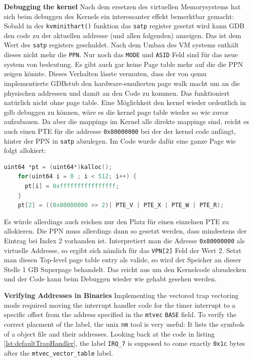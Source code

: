 \textbf{Debugging the kernel} Nach dem ersetzen des virtuellen Memorysystems hat sich beim
debuggen des Kernels ein interessanter effekt bemerktbar gemacht: Sobald in der
\texttt{kvminithart()} funktion das \texttt{satp} register gesetzt wird kann GDB den code zu der
aktuellen addresse (und allen folgenden) anzeigen.
Das ist dem Wert des \texttt{satp} registers geschuldet. Nach dem Umbau des VM systems enthält
dieses nicht mehr die \texttt{PPN}. Nur noch das \texttt{MODE} und \texttt{ASID} Feld sind
für das neue system von bedeutung. Es gibt auch gar keine Page table mehr auf die die PPN zeigen
könnte.
Dieses Verhalten lässte vermuten, dass der von qemu implementierte GDBstub den hardware-emulierten
page walk macht um an die physischen addressen und damit an den Code zu kommen. Das funktioniert
natürlich nicht ohne page table.
Eine Möglichkeit den kernel wieder ordentlich in gdb debuggen zu können, wäre es die kernel
page table wieder so wie zuvor aufzubauen. Da aber die mappings im Kernel alle direkte mappings
sind, reicht es auch einen PTE für die addresse \texttt{0x80000000} bei der der kernel code
anfängt, hinter der PPN in \texttt{satp} abzulegen.
Im Code wurde dafür eine ganze Page wie folgt allokiert:
\begin{lstlisting}[language=c,float=h!,
    label={lst:fake_pt}]
    uint64 *pt = (uint64*)kalloc();
    for(uint64 i = 0 ; i < 512; i++) {
      pt[i] = 0xffffffffffffffff;
    }
    pt[2] = ((0x80000000 >> 2)| PTE_V | PTE_X | PTE_W | PTE_R);
\end{lstlisting}
Es würde allerdings auch reichen nur den Platz für einen einzelnen PTE
zu allokieren. Die PPN muss allerdings dann so gesetzt werden,
dass mindestens der Eintrag bei Index 2 vorhanden ist. Interpretiert man
die Adresse \texttt{0x80000000} als virtuelle Addresse, so ergibt sich
nämlich für das \texttt{VPN[2]} Feld der Wert 2.
Setzt man diesen Top-level page table entry als valide, so wird der Speicher
an dieser Stelle 1 GB Superpage behandelt. Das reicht aus um den Kernelcode
abzudecken und der Code kann beim Debuggen wieder wie gehabt gesehen werden.

\textbf{Verifying Addresses in Binaries} Implementing the vectored trap vectoring mode
required moving the interrupt handler code for the timer interrupt to a specific offset
from the address specified in the \texttt{mtvec} \texttt{BASE} field.
To verify the correct placment of the label, the unix \texttt{nm} tool is very useful:
It lists the symbols of a object file and their addresses.
Looking back at the code in listing \ref{lst:defaultTrapHandler}, the label \texttt{IRQ\_7}
is supposed to come exactly \texttt{0x1c} bytes after the \texttt{mtvec\_vector\_table} label.

